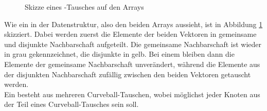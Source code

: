 \begin{figure}[h]
\centering
  \caption{Skizze eines \cb-Tausches auf den Arrays}
  \label{fig:curveball_trade_vector}
  
\end{figure}
%
%
%
%
Wie ein \ct{} in der Datenstruktur, also den beiden Arrays aussieht, ist 
in Abbildung \ref{fig:curveball_trade_vector} skizziert. Dabei werden zuerst die Elemente
der beiden Vektoren in gemeinsame und disjunkte Nachbarschaft aufgeteilt. Die gemeinsame Nachbarschaft ist
wieder in grau gekennzeichnet, die disjunkte in gelb. Bei einem \ct{} bleiben dann die Elemente 
der gemeinsame Nachbarschaft unverändert, während die Elemente aus der 
disjunkten Nachbarschaft zufällig zwischen den beiden 
Vektoren getauscht werden.
\\
Ein  besteht aus mehreren Curveball-Tauschen, wobei möglichst jeder Knoten aus der 
Teil eines Curveball-Tausches sein soll.
%
%
% 
